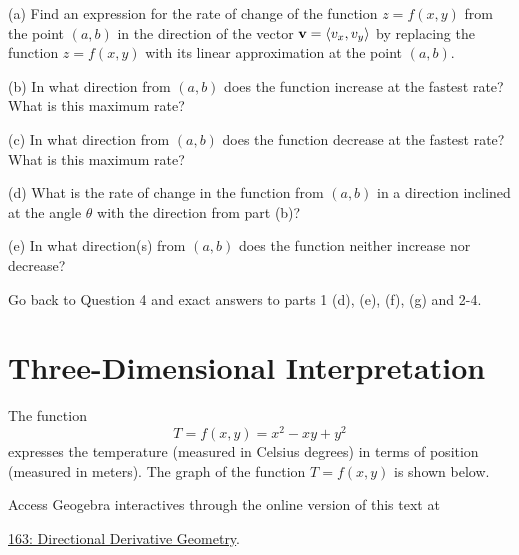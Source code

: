 \documentclass{ximera}
\begin{document}
\begin{question}  \label{Qedf4t5t}
(a) Find an expression for the rate of change of the function $z=f(x,y)$ from the point $(a,b)$ in the direction of the vector ${\bf v} = \langle v_x, v_y \rangle$ by replacing the function $z=f(x,y)$ with its linear approximation at the point $(a,b)$.

(b) In what direction from $(a,b)$ does the function increase at the fastest rate? What is this maximum rate?

(c) In what direction from $(a,b)$ does the function decrease at the fastest rate? What is this maximum rate?

(d) What is the rate of change in the function from $(a,b)$ in a direction inclined at the angle $\theta$ with the direction from part (b)?

(e)  In what direction(s) from $(a,b)$ does the function neither increase nor decrease?

\end{question}

\begin{question}  \label{Qdef67kk}
Go back to Question 4 and exact answers to parts 1 (d), (e), (f), (g) and 2-4.

\end{question}






\section{Three-Dimensional Interpretation}

\begin{exploration}  \label{Edf45t54t54t4}
The function
\[
     T = f(x,y) = x^2 - xy + y^2  
\]
expresses the temperature (measured in Celsius degrees) in terms of position (measured in meters). The graph of the function $T= f(x,y)$ is shown below.

 
\begin{onlineOnly}
    \begin{center}
\end{center}
\end{onlineOnly}

Access Geogebra interactives through the online version of this text at
 
\href{https://www.geogebra.org/classic/rdezhzbs}{163: Directional Derivative Geometry}.

\end{exploration}
\end{document}
